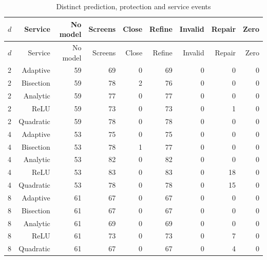 {\small\setlength{\tabcolsep}{3pt}
\begin{longtable}{lrrrrrrrr}
\caption{Distinct prediction, protection and service events}\label{tab:diagnostics89}\\
\hline
$d$ & Service & No model & Screens & Close & Refine & Invalid & Repair & Zero \\
\hline
\endfirsthead
\hline
$d$ & Service & No model & Screens & Close & Refine & Invalid & Repair & Zero \\
\hline
\endhead
2 & Adaptive & 59 & 69 & 0 & 69 & 0 & 0 & 0 \\
2 & Bisection & 59 & 78 & 2 & 76 & 0 & 0 & 0 \\
2 & Analytic & 59 & 77 & 0 & 77 & 0 & 0 & 0 \\
2 & ReLU & 59 & 73 & 0 & 73 & 0 & 1 & 0 \\
2 & Quadratic & 59 & 78 & 0 & 78 & 0 & 0 & 0 \\
4 & Adaptive & 53 & 75 & 0 & 75 & 0 & 0 & 0 \\
4 & Bisection & 53 & 78 & 1 & 77 & 0 & 0 & 0 \\
4 & Analytic & 53 & 82 & 0 & 82 & 0 & 0 & 0 \\
4 & ReLU & 53 & 83 & 0 & 83 & 0 & 18 & 0 \\
4 & Quadratic & 53 & 78 & 0 & 78 & 0 & 15 & 0 \\
8 & Adaptive & 61 & 67 & 0 & 67 & 0 & 0 & 0 \\
8 & Bisection & 61 & 67 & 0 & 67 & 0 & 0 & 0 \\
8 & Analytic & 61 & 69 & 0 & 69 & 0 & 0 & 0 \\
8 & ReLU & 61 & 73 & 0 & 73 & 0 & 7 & 0 \\
8 & Quadratic & 61 & 67 & 0 & 67 & 0 & 4 & 0 \\
\hline
\end{longtable}}
